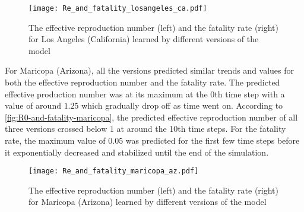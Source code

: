 \begin{figure}[!htb]
    \centering
    \texttt{[image: Re\_and\_fatality\_losangeles\_ca.pdf]}
    \caption[Learnt effective reproduction number and fatality rate for Los Angeles (California)]{The effective reproduction number (left) and the fatality rate (right) for Los Angeles (California) learned by different versions of the model}
    \label{fig:R0-and-fatality-losangeles}
\end{figure}

For Maricopa (Arizona), all the versions predicted similar trends and values for both the effective reproduction number and the fatality rate.
The predicted effective production number was at its maximum at the 0th time step with a value of around $1.25$ which gradually drop off as time went on.
According to \autoref{fig:R0-and-fatality-maricopa}, the predicted effective reproduction number of all three versions crossed below $1$ at around the 10th time steps.
For the fatality rate, the maximum value of $0.05$ was predicted for the first few time steps before it exponentially decreased and stabilized until the end of the simulation.

\begin{figure}[!htb]
    \centering
    \texttt{[image: Re\_and\_fatality\_maricopa\_az.pdf]}
    \caption[Learnt effective reproduction number and fatality rate for Maricopa (Arizona)]{The effective reproduction number (left) and the fatality rate (right) for Maricopa (Arizona) learned by different versions of the model}
    \label{fig:R0-and-fatality-maricopa}
\end{figure}
